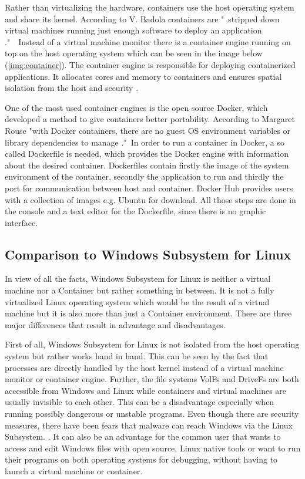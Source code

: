 \documentclass[utf8,biblatex, ngerman, english]{lni}
\begin{document}
Rather than virtualizing the hardware, containers use the host operating system and share its kernel. According to V. Badola containers are "\ stripped down virtual machines running just enough software to deploy an application \cite{Ba15}."\ \ Instead of a virtual machine monitor there is a container engine running on top on the host operating system which can be seen in the image below (\ref{img:container}). 
The container engine is responsible for deploying containerized applications. It allocates cores and memory to containers and ensures spatial isolation from the host and security \cite{Do17}.

One of the most used container engines is the open source Docker, which developed a method to give containers better portability. According to Margaret Rouse "with Docker containers, there are no guest OS environment variables or library dependencies to manage \cite{Ma}."\ In order to run a container in Docker, a so called Dockerfile is needed, which provides the Docker engine with information about the desired container.
Dockerfiles contain firstly the image of the system environment of the container, secondly the application to run and thirdly the port for communication between host and container. Docker Hub provides users with a collection of images e.g. Ubuntu for download. All those steps are done in the console and a text editor for the Dockerfile, since there is no graphic interface.

\subsection{Comparison to Windows Subsystem for Linux}

In view of all the facts, Windows Subsystem for Linux is neither a virtual machine nor a Container but rather something in between. It is not a fully virtualized Linux operating system which would be the result of a virtual machine but it is also more than just a Container environment. There are three major differences that result in advantage and disadvantages. 

First of all, Windows Subsystem for Linux is not isolated from the host operating system but rather works hand in hand. This can be seen by the fact that processes are directly handled by the host kernel instead of a virtual machine monitor or container engine. Further, the file systems VolFs and DriveFs are both accessible from Windows and Linux while containers and virtual machines are usually invisible to each other. This can be a disadvantage especially when running possibly dangerous or unstable programs. Even though there are security measures, there have been fears that malware can reach Windows via the Linux Subsystem. \cite{Tu17}. It can also be an advantage for the common user that wants to access and edit Windows files with open source, Linux native tools or want to run their programs on both operating systems for debugging, without having to launch a virtual machine or container.
\end{document}
